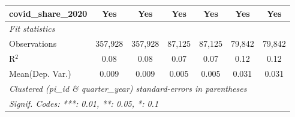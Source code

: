 \begin{tabular}{lcccccc}
   covid\_share\_2020                                          & Yes            & Yes           & Yes           & Yes           & Yes           & Yes\\  
   \midrule
   \emph{Fit statistics}\\
   Observations                                                & 357,928        & 357,928       & 87,125        & 87,125        & 79,842        & 79,842\\  
   R$^2$                                                       & 0.08           & 0.08          & 0.07          & 0.07          & 0.12          & 0.12\\  
Mean(Dep. Var.) & 0.009 & 0.009 & 0.005 & 0.005 & 0.031 & 0.031 \\
   \midrule \midrule
   \multicolumn{7}{l}{\emph{Clustered (pi\_id \& quarter\_year) standard-errors in parentheses}}\\
   \multicolumn{7}{l}{\emph{Signif. Codes: ***: 0.01, **: 0.05, *: 0.1}}\\
\end{tabular}
\par\endgroup
